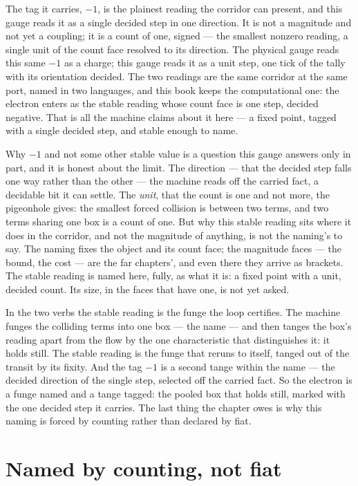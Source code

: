 The tag it carries, $-1$, is the plainest reading the corridor can present, and this gauge reads it as a single decided
step in one direction. It is not a magnitude and not yet a coupling; it is a count of one, signed --- the smallest
nonzero reading, a single unit of the count face resolved to its direction. The physical gauge reads this same $-1$ as a
charge; this gauge reads it as a unit step, one tick of the tally with its orientation decided. The two readings are the
same corridor at the same port, named in two languages, and this book keeps the computational one: the electron enters
as the stable reading whose count face is one step, decided negative. That is all the machine claims about it here --- a
fixed point, tagged with a single decided step, and stable enough to name.

Why $-1$ and not some other stable value is a question this gauge answers only in part, and it is honest about the
limit. The direction --- that the decided step falls one way rather than the other --- the machine reads off the carried
fact, a decidable bit it can settle. The \emph{unit}, that the count is one and not more, the pigeonhole gives: the
smallest forced collision is between two terms, and two terms sharing one box is a count of one. But why this stable
reading sits where it does in the corridor, and not the magnitude of anything, is not the naming's to say. The naming
fixes the object and its count face; the magnitude faces --- the bound, the cost --- are the far chapters', and even
there they arrive as brackets. The stable reading is named here, fully, as what it is: a fixed point with a unit,
decided count. Its size, in the faces that have one, is not yet asked.

In the two verbs the stable reading is the funge the loop certifies. The machine funges the colliding terms into one box
--- the name --- and then tanges the box's reading apart from the flow by the one characteristic that distinguishes it:
it holds still. The stable reading is the funge that reruns to itself, tanged out of the transit by its fixity. And the
tag $-1$ is a second tange within the name --- the decided direction of the single step, selected off the carried fact.
So the electron is a funge named and a tange tagged: the pooled box that holds still, marked with the one decided step it
carries. The last thing the chapter owes is why this naming is forced by counting rather than declared by fiat.

\section{Named by counting, not fiat}

